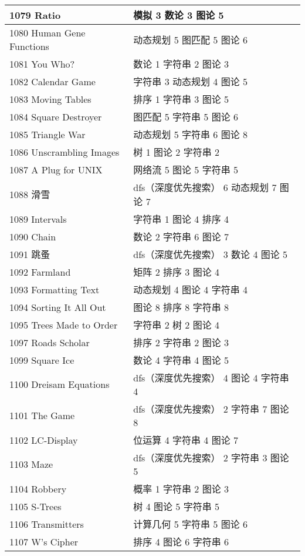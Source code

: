 \begin{longtable}{| p{} | p{} |}
 1079 Ratio  & 模拟 3 数论 3 图论 5 \\ \hline
 1080 Human Gene Functions  & 动态规划 5 图匹配 5 图论 6 \\ \hline
 1081 You Who?  & 数论 1 字符串 2 图论 3 \\ \hline
 1082 Calendar Game  & 字符串 3 动态规划 4 图论 5 \\ \hline
 1083 Moving Tables  & 排序 1 字符串 3 图论 5 \\ \hline
 1084 Square Destroyer  & 图匹配 5 字符串 5 图论 6 \\ \hline
 1085 Triangle War  & 动态规划 5 字符串 6 图论 8 \\ \hline
 1086 Unscrambling Images  & 树 1 图论 2 字符串 2 \\ \hline
 1087 A Plug for UNIX  & 网络流 5 图论 5 字符串 5 \\ \hline
 1088 滑雪  & dfs（深度优先搜索） 6 动态规划 7 图论 7 \\ \hline
 1089 Intervals  & 字符串 1 图论 4 排序 4 \\ \hline
 1090 Chain  & 数论 2 字符串 6 图论 7 \\ \hline
 1091 跳蚤  & dfs（深度优先搜索） 3 数论 4 图论 5 \\ \hline
 1092 Farmland  & 矩阵 2 排序 3 图论 4 \\ \hline
 1093 Formatting Text  & 动态规划 4 图论 4 字符串 4 \\ \hline
 1094 Sorting It All Out  & 图论 8 排序 8 字符串 8 \\ \hline
 1095 Trees Made to Order  & 字符串 2 树 2 图论 4 \\ \hline
 1097 Roads Scholar  & 排序 2 字符串 2 图论 3 \\ \hline
 1099 Square Ice  & 数论 4 字符串 4 图论 5 \\ \hline
 1100 Dreisam Equations  & dfs（深度优先搜索） 4 图论 4 字符串 4 \\ \hline
 1101 The Game  & dfs（深度优先搜索） 2 字符串 7 图论 8 \\ \hline
 1102 LC-Display  & 位运算 4 字符串 4 图论 7 \\ \hline
 1103 Maze  & dfs（深度优先搜索） 2 字符串 3 图论 5 \\ \hline
 1104 Robbery  & 概率 1 字符串 2 图论 3 \\ \hline
 1105 S-Trees  & 树 4 图论 5 字符串 5 \\ \hline
 1106 Transmitters  & 计算几何 5 字符串 5 图论 6 \\ \hline
 1107 W's Cipher  & 排序 4 图论 6 字符串 6 \\ \hline

\end{longtable}
